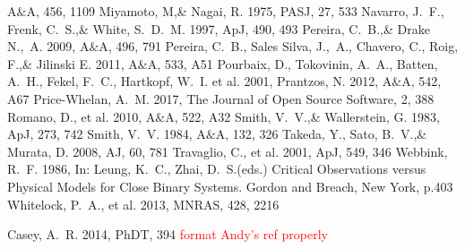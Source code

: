 \documentclass[a4paper,fleqn,usenatbib]{mnras}
\newcommand{\todo}[1]{\textcolor{red}{#1}}
\begin{document}
\begin{thebibliography}{99}
A$\&$A, 456, 1109
Miyamoto, M,\& Nagai, R. 1975, 
PASJ, 27, 533
Navarro, J.~F., Frenk, C.~S.,\& White, S.~D.~M. 1997, 
ApJ, 490, 493
Pereira, C.~B.,\& Drake N.,~A. 2009, 
A$\&$A, 496, 791
Pereira, C.~B., Sales Silva, J.,~A., Chavero, C., Roig, F.,\& Jilinski E. 2011, 
A$\&$A, 533, A51
Pourbaix, D., Tokovinin, A.~A., Batten, A.~H., Fekel, F.~C., Hartkopf, W.~I. et al. 2001, 
Prantzos, N. 2012, 
A$\&$A, 542, A67
Price-Whelan, A.~M. 2017, 
The Journal of Open Source Software, 2, 388
Romano, D., et al. 2010, 
A$\&$A, 522, A32
Smith, V.~V.,\& Wallerstein, G. 1983, 
ApJ, 273, 742
Smith, V.~V. 1984, 
A$\&$A, 132, 326
Takeda, Y., Sato, B.~V.,\& Murata, D. 2008, 
AJ, 60, 781
Travaglio, C., et al. 2001, 
ApJ, 549, 346
Webbink, R.~F. 1986, 
In: Leung, K.~C., Zhai, D.~S.(eds.) Critical Observations versus Physical Models for Close Binary Systems. Gordon and Breach, New York, p.403
Whitelock, P.~A., et al. 2013, 
MNRAS, 428, 2216

Casey, A.~R. 2014, 
PhDT, 394
\todo{format Andy's ref properly}

\end{thebibliography}


\bsp	%
\label{lastpage}
\end{document}

